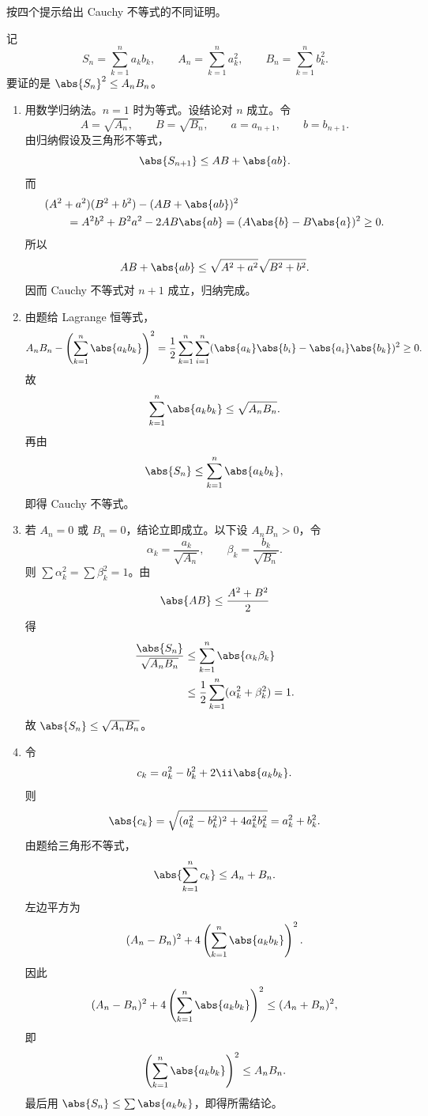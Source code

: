 \begin{xexercise}[6]
按四个提示给出 Cauchy 不等式的不同证明。
\end{xexercise}
\begin{xsolution}
记
\[
  S_n=\sum_{k=1}^n a_kb_k,
  \qquad
  A_n=\sum_{k=1}^n a_k^2,
  \qquad
  B_n=\sum_{k=1}^n b_k^2.
\]
要证的是 $\abs{S_n}^2\le A_nB_n$。

\begin{enumerate}[label=(\arabic*)]
  \item 用数学归纳法。$n=1$ 时为等式。设结论对 $n$ 成立。令
  \[
    A=\sqrt{A_n},\qquad B=\sqrt{B_n},\qquad a=a_{n+1},\qquad b=b_{n+1}.
  \]
  由归纳假设及三角形不等式，
  \[
    \abs{S_{n+1}}\le AB+\abs{ab}.
  \]
  而
  \[
  \begin{aligned}
    &(A^2+a^2)(B^2+b^2)-(AB+\abs{ab})^2\\
    &\qquad=A^2b^2+B^2a^2-2AB\abs{ab}
    =(A\abs{b}-B\abs{a})^2\ge0.
  \end{aligned}
  \]
  所以
  \[
    AB+\abs{ab}\le\sqrt{A^2+a^2}\sqrt{B^2+b^2}.
  \]
  因而 Cauchy 不等式对 $n+1$ 成立，归纳完成。

  \item 由题给 Lagrange 恒等式，
  \[
    A_nB_n-\left(\sum_{k=1}^n\abs{a_kb_k}\right)^2
    =\frac12\sum_{k=1}^n\sum_{i=1}^n
    (\abs{a_k}\abs{b_i}-\abs{a_i}\abs{b_k})^2\ge0.
  \]
  故
  \[
    \sum_{k=1}^n\abs{a_kb_k}\le\sqrt{A_nB_n}.
  \]
  再由
  \[
    \abs{S_n}\le\sum_{k=1}^n\abs{a_kb_k},
  \]
  即得 Cauchy 不等式。

  \item 若 $A_n=0$ 或 $B_n=0$，结论立即成立。以下设 $A_nB_n>0$，令
  \[
    \alpha_k=\frac{a_k}{\sqrt{A_n}},
    \qquad
    \beta_k=\frac{b_k}{\sqrt{B_n}}.
  \]
  则 $\sum\alpha_k^2=\sum\beta_k^2=1$。由
  \[
    \abs{AB}\le\frac{A^2+B^2}{2}
  \]
  得
  \[
  \begin{aligned}
    \frac{\abs{S_n}}{\sqrt{A_nB_n}}
    &\le\sum_{k=1}^n\abs{\alpha_k\beta_k}\\
    &\le\frac12\sum_{k=1}^n(\alpha_k^2+\beta_k^2)=1.
  \end{aligned}
  \]
  故 $\abs{S_n}\le\sqrt{A_nB_n}$。

  \item 令
  \[
    c_k=a_k^2-b_k^2+2\ii\abs{a_kb_k}.
  \]
  则
  \[
    \abs{c_k}
    =\sqrt{(a_k^2-b_k^2)^2+4a_k^2b_k^2}
    =a_k^2+b_k^2.
  \]
  由题给三角形不等式，
  \[
    \abs{\sum_{k=1}^n c_k}\le A_n+B_n.
  \]
  左边平方为
  \[
    (A_n-B_n)^2+4\left(\sum_{k=1}^n\abs{a_kb_k}\right)^2.
  \]
  因此
  \[
    (A_n-B_n)^2+4\left(\sum_{k=1}^n\abs{a_kb_k}\right)^2
    \le(A_n+B_n)^2,
  \]
  即
  \[
    \left(\sum_{k=1}^n\abs{a_kb_k}\right)^2\le A_nB_n.
  \]
  最后用 $\abs{S_n}\le\sum\abs{a_kb_k}$，即得所需结论。
\end{enumerate}
\end{xsolution}

